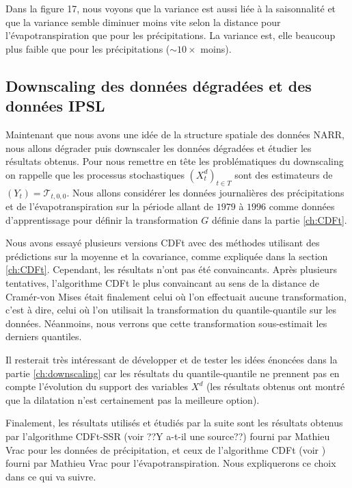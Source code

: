 \documentclass[a4paper,11pt]{article}
\numberwithin{equation}{section}
\begin{document}
Dans la figure 17, nous voyons que la variance est aussi liée à la saisonnalité et que la variance semble diminuer moins vite selon la distance pour l'évapotranspiration que pour les précipitations. La variance est, elle beaucoup plus faible que pour les précipitations ($\sim 10 \times$ moins). 

\subsection{Downscaling des données dégradées et des données IPSL}
\label{ch:downscaling des donnees}

Maintenant que nous avons une idée de la structure spatiale des données NARR, nous allons dégrader puis downscaler les données dégradées et étudier les résultats obtenus. Pour nous remettre en tête les problématiques du downscaling on rappelle que les processus stochastiques $(X^d_t)_{t\in T}$ sont des estimateurs de $(Y_t)=\mathcal{T}_{t,0,0}$. Nous allons considérer les données journalières des précipitations et de l'évapotranspiration sur la période allant de $1979$ à $1996$ comme données d'apprentissage pour définir la transformation $G$ définie dans la partie \ref{ch:CDFt}.

Nous avons essayé plusieurs versions CDFt avec des méthodes utilisant des prédictions sur la moyenne et la covariance, comme expliquée dans la section \ref{ch:CDFt}. Cependant, les résultats n'ont pas été convaincants. Après plusieurs tentatives, l'algorithme CDFt le plus convaincant au sens de la distance de Cramér-von Mises était finalement celui où l'on effectuait aucune transformation, c'est à dire, celui où l'on utilisait la transformation du quantile-quantile sur les données. Néanmoins, nous verrons que cette transformation sous-estimait les derniers quantiles.

Il resterait très intéressant de développer et de tester les idées énoncées dans la partie \ref{ch:downscaling} car les résultats du quantile-quantile ne prennent pas en compte l'évolution du support des variables $X^d$ (les résultats obtenus ont montré que la dilatation n'est certainement pas la meilleure option).

Finalement, les résultats utilisés et étudiés par la suite sont les résultats obtenus par l'algorithme CDFt-SSR (voir ??Y a-t-il une source??) fourni par Mathieu Vrac pour les données de précipitation, et ceux de l'algorithme CDFt (voir \cite{vrac2012dynamical}) fourni par Mathieu Vrac pour l'évapotranspiration. Nous expliquerons ce choix dans ce qui va suivre.
\end{document}
